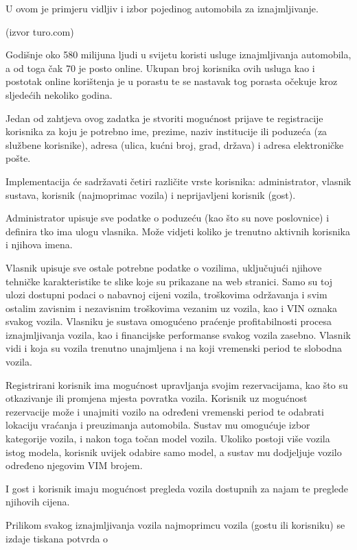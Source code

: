 		 \text U ovom je primjeru vidljiv i izbor pojedinog automobila za iznajmljivanje. \par
		 \text (izvor turo.com) \par 
		 \text Godišnje oko 580 milijuna ljudi u svijetu koristi usluge iznajmljivanja  automobila, a od toga čak 70 je posto online. Ukupan broj korisnika ovih usluga kao i postotak online korištenja je u porastu te se nastavak tog porasta očekuje kroz sljedećih nekoliko godina. \par
		 \text Jedan od zahtjeva ovog zadatka je stvoriti mogućnost prijave te registracije korisnika za koju je potrebno ime, prezime,  naziv institucije ili poduzeća (za službene korisnike), adresa (ulica, kućni broj,
grad, država) i adresa elektroničke pošte. \par 
         \text Implementacija će sadržavati četiri različite vrste korisnika: administrator, vlasnik sustava,
korisnik (najmoprimac vozila) i neprijavljeni korisnik (gost). \par
        \text Administrator upisuje sve podatke o poduzeću (kao što su nove poslovnice) i definira tko ima ulogu vlasnika. Može vidjeti koliko je trenutno aktivnih korisnika i njihova imena.\par 
\text Vlasnik upisuje sve ostale potrebne podatke o vozilima, uključujući njihove tehničke
karakteristike te slike koje su prikazane na web stranici. Samo su toj ulozi 
dostupni podaci o nabavnoj cijeni vozila, troškovima održavanja i svim ostalim zavisnim
i nezavisnim troškovima vezanim uz vozila, kao i VIN oznaka svakog vozila.
Vlasniku je sustava omogućeno praćenje profitabilnosti procesa
iznajmljivanja vozila, kao i financijske performanse svakog vozila zasebno. Vlasnik vidi i koja su vozila trenutno unajmljena i na koji vremenski period te slobodna vozila. \par 
\text Registrirani korisnik ima mogućnost upravljanja svojim rezervacijama, kao što su otkazivanje ili promjena mjesta povratka vozila. Korisnik uz mogućnost rezervacije može i unajmiti vozilo na određeni vremenski period te odabrati lokaciju vraćanja i preuzimanja automobila. Sustav
mu omogućuje izbor kategorije vozila, i nakon toga točan model vozila. Ukoliko postoji
više vozila istog modela, korisnik uvijek odabire samo model, a sustav mu dodjeljuje
vozilo određeno njegovim VIM brojem. \par 
\text I gost i korisnik imaju mogućnost pregleda vozila dostupnih za najam te preglede njihovih cijena. \par 
 \text Prilikom svakog iznajmljivanja vozila najmoprimcu vozila (gostu ili korisniku) se izdaje tiskana potvrda o
